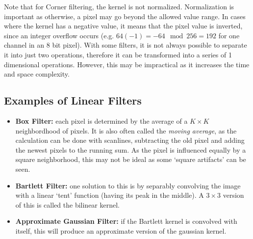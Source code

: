\documentclass[twoside,a4paper,article]{combine}
\begin{document}
Note that for Corner filtering, the kernel is not normalized. Normalization is important as otherwise, a pixel may go beyond the allowed value range.
In cases where the kernel has a negative value, it means that the pixel value is inverted, since an integer overflow occurs (e.g. $64
(-1)= -64 \mod 256 = 192$ for one channel in an 8 bit pixel).
With some filters, it is not always possible to separate it into just two operations, therefore it can be
transformed into a series of 1 dimensional operations. However, this may be impractical as it increases the time and space
complexity.

\subsection{Examples of Linear Filters}
\begin{itemize}
    \item \textbf{Box Filter:} each pixel is determined by the average of a $K \times K$ 
        neighbordhood of pixels. It is also often called the \emph{moving average}, as the calculation can be done with scanlines, subtracting the
        old pixel and adding the newest pixels to the running sum. As the pixel is influenced equally by a square neighborhood, this may not be ideal as some `square artifacts' can be seen.
    \item \textbf{Bartlett Filter:} one solution to this is by separably convolving the image
        with a linear `tent' function (having its peak in the middle). A $3\times 3$ version of this is called the bilinear kernel.
    \item \textbf{Approximate Gaussian Filter:} if the Bartlett kernel is convolved with itself, this will produce an approximate version of the gaussian kernel.
\end{itemize}
\end{document}
